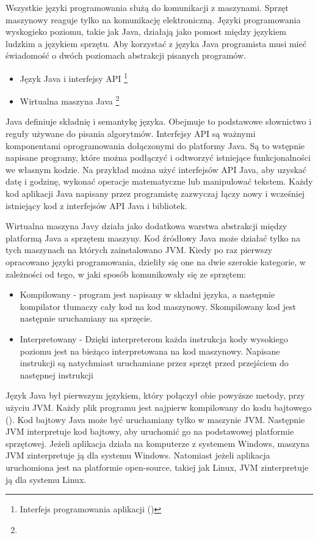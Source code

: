 Wszystkie języki programowania służą do komunikacji z maszynami. Sprzęt maszynowy reaguje tylko na komunikację elektroniczną. Języki programowania wyskogieko poziomu, takie jak Java, działają jako pomost między językiem ludzkim a językiem sprzętu. Aby korzystać z języka Java programista musi mieć świadomość o dwóch poziomach abstrakcji pisanych programów. 
\begin{itemize}
    \item Język Java i interfejsy API \footnote{Interfejs programowania aplikacji ()}
    \item Wirtualna maszyna Java \footnote{}
\end{itemize}

Java definiuje składnię i semantykę języka. Obejmuje to podstawowe słownictwo i reguły używane do pisania algorytmów. 
Interfejsy API są ważnymi komponentami oprogramowania dołączonymi do platformy Java. Są to wstępnie napisane programy, które można podłączyć i odtworzyć istniejące funkcjonalności we własnym kodzie. Na przykład można użyć interfejsów API Java, aby uzyskać datę i godzinę, wykonać operacje matematyczne lub manipulować tekstem. Każdy kod aplikacji Java napisany przez programistę zazwyczaj łączy nowy i wcześniej istniejący kod z interfejsów API Java i bibliotek\cite{javaAmazon}\cite{javaDEV}.

Wirtualna maszyna Javy działa jako dodatkowa warstwa abstrakcji między platformą Java a sprzętem maszyny. Kod źródłowy Java może działać tylko na tych maszynach na których zainstalowano JVM. Kiedy po raz pierwszy opracowano języki programowania, dzieliły się one na dwie szerokie kategorie, w zależności od tego, w jaki sposób komunikowały się ze sprzętem: 

\begin{itemize}
    \item Kompilowany - program jest napisany w składni języka, a następnie kompilator tłumaczy cały kod na kod maszynowy. Skompilowany kod jest następnie uruchamiany na sprzęcie.
    \item Interpretowany - Dzięki interpreterom każda instrukcja kody wysokiego poziomu jest na bieżąco interpretowana na kod maszynowy. Napisane instrukcji są natychmiast uruchamiane przez sprzęt przed przejściem do następnej instrukcji
\end{itemize}

Język Java był pierwszym językiem, który połączył obie powyższe metody, przy użyciu JVM. Każdy plik programu jest najpierw kompilowany do kodu bajtowego (). Kod bajtowy Java może być uruchamiany tylko w maszynie JVM. Następnie JVM interpretuje kod bajtowy, aby uruchomić go na podstawowej platformie sprzętowej. Jeżeli aplikacja działa na komputerze z systemem Windows, maszyna JVM zinterpretuje ją dla systemu Windows. Natomiast jeżeli aplikacja uruchomiona jest na platformie open-source, takiej jak Linux, JVM zinterpretuje ją dla systemu Linux\cite{javaAmazon}\cite{javaDEV}.


